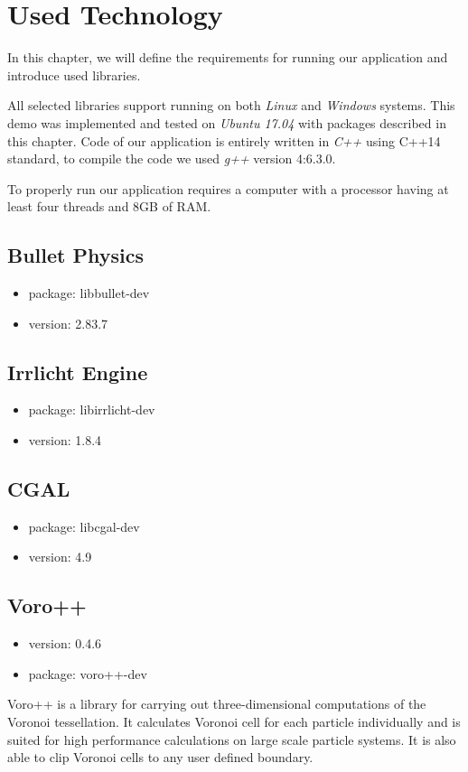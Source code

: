 \chapter{Used Technology}
\label{chapt:technology}
In this chapter, we will define the requirements for running our application and introduce used libraries.

All selected libraries support running on both \emph{Linux} and \emph{Windows} systems. This demo was implemented and tested on \emph{Ubuntu 17.04} with packages described in this chapter. Code of our application is entirely written in \emph{C++} using C++14 standard, to compile the code we used \emph{g++} version 4:6.3.0.

To properly run our application requires a computer with a processor having at least four threads and 8GB of RAM.

\section{Bullet Physics}
\begin{itemize}
\item package: libbullet-dev
\item version: 2.83.7
\end{itemize}


\section{Irrlicht Engine}
\begin{itemize}
\item package: libirrlicht-dev
\item version: 1.8.4
\end{itemize}

\section{CGAL}
\begin{itemize}
\item package: libcgal-dev
\item version: 4.9
\end{itemize}

\section{Voro++}
\begin{itemize}
\item version: 0.4.6
\item package: voro++-dev
\end{itemize}
Voro++ is a library for carrying out three-dimensional computations of the Voronoi tessellation. It calculates Voronoi cell for each particle individually and is suited for high performance calculations on large scale particle systems. It is also able to clip Voronoi cells to any user defined boundary.

